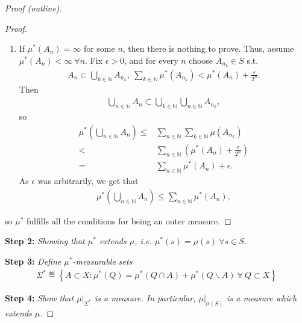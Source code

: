 \begin{proof}[Proof (outline)]
\begin{proof}
\begin{enumerate}
            \item If \(\mu^{*}(A_n) = \infty\) for some \(n\), then there is nothing to prove. Thus, assume \(\mu^{*}(A_n) < \infty \ \forall n\).
            Fix \(\epsilon > 0\), and for every \(n\) choose \(A_{n_k}\in S\) s.t.
            \begin{align*}
                A_n \subset \bigcup\limits_{k\in\mathbb{N}} A_{n_k}, \ 
                \sum\limits_{k\in\mathbb{N}}\mu^{*}(A_{n_k}) < \mu^{*}(A_n) + \frac{\epsilon}{2^n}.
            \end{align*}
            Then
            \begin{align*}
                \bigcup\limits_{n\in\mathbb{N}} A_n \subset \bigcup\limits_{k\in\mathbb{N}}\bigcup\limits_{n\in\mathbb{N}} A_{n_k},
            \end{align*}
            so 
            \begin{align*}
                \mu^{*}\left( \bigcup\limits_{n\in\mathbb{N}} A_n\right) \leq& \sum\limits_{n\in\mathbb{N}}\sum\limits_{k\in\mathbb{N}}\mu\left(A_{n_k}\right) \\
                <& \sum\limits_{n\in\mathbb{N}}\left( \mu^{*}(A_n) + \frac{\epsilon}{2^n}\right) \\ 
                =& \sum\limits_{n\in\mathbb{N}}\mu^{*}(A_n) + \epsilon.
            \end{align*}
            As \(\epsilon\) was arbitrarily, we get that
            \begin{align*}
                \mu^{*}\left( \bigcup\limits_{n\in\mathbb{N}} A_n\right) \leq \sum\limits_{n\in\mathbb{N}}\mu^{*}(A_n),
            \end{align*}
        \end{enumerate}
        so \(\mu^{*}\) fulfills all the conditions for being an outer measure.
    \end{proof}
    \textbf{Step 2:} \emph{Showing that \(\mu^{*}\) extends \(\mu\), i.e. \(\mu^{*}(s) = \mu(s) \ \forall s\in S\).}
    
    \textbf{Step 3:} \emph{Define \(\mu^{*}\)-measurable sets}
    \begin{align*}
        \Sigma^{*} \eqdef \left\{ A \subset X: \mu^{*}(Q) = \mu^{*}(Q\cap A) + \mu^{*}(Q \backslash A) \ \forall \ Q \subset X \right\}
    \end{align*}

    \textbf{Step 4:} \emph{Show that \(\mu\vert_{\Sigma^{*}}\) is a measure. In particular, \(\mu\vert_{\sigma(S)}\) is a measure which extends \(\mu\).}
    
\end{proof}

